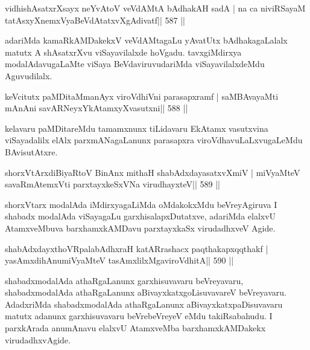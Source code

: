 \begin{shl}
vidhishAsatxrXsayx neYvAtoV veVdAMtA bAdhakAH sadA |
na ca niviRSayaM tatAsxyXnemxVyaBeVdAtatxvXgAdivatf\hfill || 587 ||
\end{shl}

\begin{artha}
adariMda kamaRkAMDakekxV veVdAMtagaLu yAvatUtx bAdhakagaLalalx matutx A shAsatxrXvu viSayavilalxde hoVgadu. tavxgiMdirxya modalAdavugaLaMte viSaya BeVdaviruvudariMda viSayavilalxdeMdu Aguvudilalx.
\end{artha}


\begin{shl}
keVcitutx paMDitaMmanAyx viroVdhiVni parasapxramf |
saMBAvayaMti mAnAni savARNeyxYkAtamxyXvasutxni\hfill || 588 ||
\end{shl}

\begin{artha}
kelavaru paMDitareMdu tamamxnunx tiLidavaru EkAtamx vasutxvina viSayadalilx elAlx parxmANagaLanunx parasapxra viroVdhavuLaLxvugaLeMdu BAvisutAtxre.
\end{artha}



\begin{shl}
shorxVtArxdiBiyaRtoV BinAnx mithaH shabAdxdayasatxvXmiV |
miVyaMteV savaRmAtemxVti parxtayxkeSxVNa virudhayxteV\hfill || 589 ||
\end{shl}

\begin{artha}
shorxVtarx modalAda iMdirxyagaLiMda oMdakokxMdu beVreyAgiruva I shabadx modalAda viSayagaLu garxhisalapxDutatxve, adariMda elalxvU AtamxveMbuva barxhamxkAMDavu parxtayxkaSx virudadhxveV Agide.
\end{artha}



\begin{shl}
shabAdxdayxthoVRpalabAdhxraH katARrashacx paqthakapxqqthakf |
yasAmxdihAnumiVyaMteV tasAmxlilxMgaviroVdhitA\hfill || 590 ||
\end{shl}


\begin{artha}
shabadxmodalAda athaRgaLanunx garxhisuvavaru beVreyavaru, shabadxmodalAda athaRgaLanunx aBivayxkatxgoLisuvavareV beVreyavaru. AdadxriMda shabadxmodalAda athaRgaLanunx aBivayxkatxpaDisuvavaru matutx adanunx garxhisuvavaru beVrebeVreyeV eMdu takiRsabahudu. I parxkArada anumAnavu elalxvU AtamxveMba barxhamxkAMDakekx virudadhxvAgide.
\end{artha}


